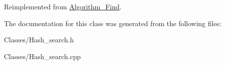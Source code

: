 Reimplemented from \hyperlink{class_algorithm___find_aabdd8c1d9dba0d5482382902def6eae8}{Algorithm\-\_\-\-Find}.



The documentation for this class was generated from the following files\-:\begin{DoxyCompactItemize}
\item 
Classes/Hash\-\_\-search.\-h\item 
Classes/Hash\-\_\-search.\-cpp\end{DoxyCompactItemize}
